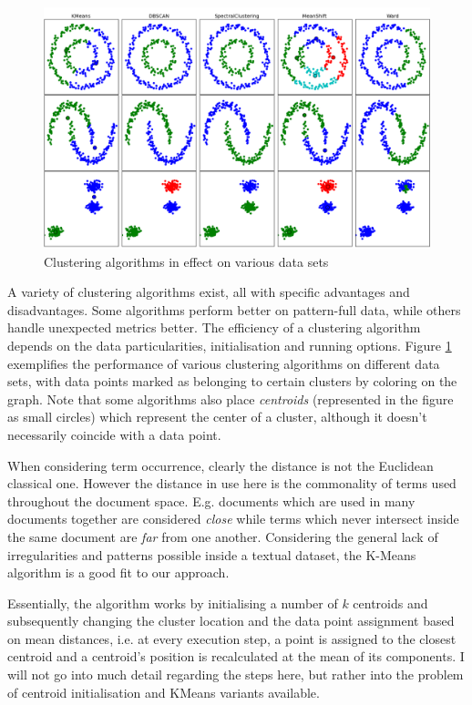 \begin{figure}
    \centering
\includegraphics[width=\columnwidth]{img/clustering.png}
    \caption{Clustering algorithms in effect on various data sets}
    \label{fig:clustering}
\end{figure}

A variety of clustering algorithms exist, all with specific advantages and disadvantages. Some algorithms perform better on pattern-full data, while others handle unexpected metrics better. The efficiency of a clustering algorithm depends on the data particularities, initialisation and running options. Figure \ref{fig:clustering} exemplifies the performance of various clustering algorithms on different data sets, with data points marked as belonging to certain clusters by coloring on the graph. Note that some algorithms also place \emph{centroids} (represented in the figure as small circles) which represent the center of a cluster, although it doesn't necessarily coincide with a data point.

When considering term occurrence, clearly the distance is not the Euclidean classical one. However the distance in use here is the commonality of terms used throughout the document space. E.g. documents which are used in many documents together are considered \emph{close} while terms which never intersect inside the same document are \emph{far} from one another. Considering the general lack of irregularities and patterns possible inside a textual dataset, the K-Means algorithm is a good fit to our approach.

Essentially, the algorithm works by initialising a number of $k$ centroids and subsequently changing the cluster location and the data point assignment based on mean distances, i.e. at every execution step, a point is assigned to the closest centroid and a centroid's position is recalculated at the mean of its components. I will not go into much detail regarding the steps here, but rather into the problem of centroid initialisation and KMeans variants available.

